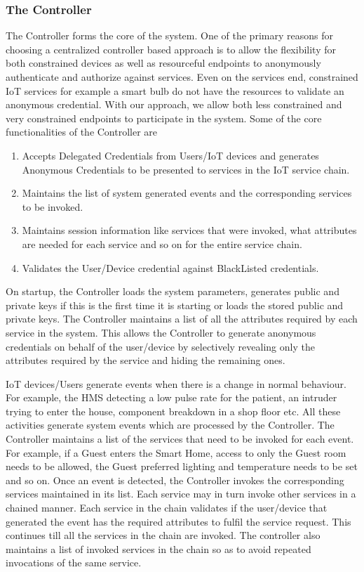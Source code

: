 \documentclass[journal]{IEEEtran}
\begin{document}
\subsubsection{The Controller} \label{controller}
The Controller forms the core of the system. One of the primary reasons for choosing a centralized controller based approach is to allow the flexibility for both constrained devices as well as resourceful endpoints to anonymously authenticate and authorize against services. Even on the services end, constrained IoT services for example a smart bulb do not have the resources to validate an anonymous credential. With our approach, we allow both less constrained and very constrained endpoints to participate in the system. Some of the core functionalities of the Controller are

\begin{enumerate}[label=\alph*)]
	\item Accepts Delegated Credentials from Users/IoT devices and generates Anonymous Credentials to be presented to services in the IoT service chain.
	\item Maintains the list of system generated events and the corresponding services to be invoked.
	\item Maintains session information like services that were invoked, what attributes are needed for each service and so on for the entire service chain.
	\item Validates the User/Device credential against BlackListed credentials.
\end{enumerate}
On startup, the Controller loads the system parameters, generates public and private keys if this is the first time it is starting or loads the stored public and private keys. The Controller maintains a list of all the attributes required by each service in the system. This allows the Controller to generate anonymous credentials on behalf of the user/device by selectively revealing only the attributes required by the service and hiding the remaining ones. 

IoT devices/Users generate events when there is a change in normal behaviour. For example, the HMS detecting a low pulse rate for the patient, an intruder trying to enter the house, component breakdown in a shop floor etc. All these activities generate system events which are processed by the Controller. The Controller maintains a list of the services that need to be invoked for each event. For example, if a Guest enters the Smart Home, access to only the Guest room needs to be allowed, the Guest preferred lighting and temperature needs to be set and so on. Once an event is detected, the Controller invokes the corresponding services maintained in its list. Each service may in turn invoke other services in a chained manner. Each service in the chain validates if the user/device that generated the event has the required attributes to fulfil the service request. This continues till all the services in the chain are invoked. The controller also maintains a list of invoked services in the chain so as to avoid repeated invocations of the same service.
\end{document}
